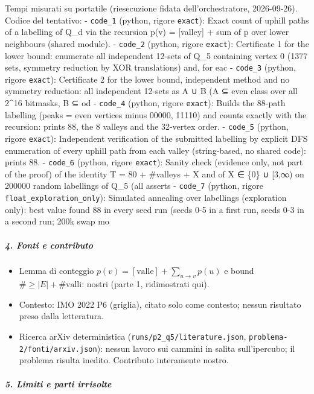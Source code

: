 \documentclass[11pt,a4paper]{article}
\providecommand{\tightlist}{\setlength{\itemsep}{0pt}\setlength{\parskip}{0pt}}
\begin{document}
Tempi misurati su portatile (riesecuzione fidata dell'orchestratore,
2026-09-26). Codice del tentativo: - \texttt{code\_1} (python, rigore
\texttt{exact}): Exact count of uphill paths of a labelling of Q\_d via
the recursion p(v) = {[}valley{]} + sum of p over lower neighbours
(shared module). - \texttt{code\_2} (python, rigore \texttt{exact}):
Certificate 1 for the lower bound: enumerate all independent 12-sets of
Q\_5 containing vertex 0 (1377 sets, symmetry reduction by XOR
translations) and, for eac - \texttt{code\_3} (python, rigore
\texttt{exact}): Certificate 2 for the lower bound, independent method
and no symmetry reduction: all independent 12-sets as A ∪ B (A ⊆ even
class over all 2\^{}16 bitmasks, B ⊆ od - \texttt{code\_4} (python,
rigore \texttt{exact}): Builds the 88-path labelling (peaks = even
vertices minus 00000, 11110) and counts exactly with the recursion:
prints 88, the 8 valleys and the 32-vertex order. - \texttt{code\_5}
(python, rigore \texttt{exact}): Independent verification of the
submitted labelling by explicit DFS enumeration of every uphill path
from each valley (string-based, no shared code): prints 88. -
\texttt{code\_6} (python, rigore \texttt{exact}): Sanity check (evidence
only, not part of the proof) of the identity T = 80 + \#valleys + X and
of X ∈ \{0\} ∪ {[}3,∞) on 200000 random labellings of Q\_5 (all asserts
- \texttt{code\_7} (python, rigore \texttt{float\_exploration\_only}):
Simulated annealing over labellings (exploration only): best value found
88 in every seed run (seeds 0-5 in a first run, seeds 0-3 in a second
run; 200k swap mo

\subparagraph{4. Fonti e contributo}\label{fonti-e-contributo}

\begin{itemize}
\tightlist
\item
  Lemma di conteggio \(p(v)=[\text{valle}]+\sum_{u\to v}p(u)\) e bound
  \(\#\ge|E|+\#\text{valli}\): nostri (parte 1, ridimostrati qui).
\item
  Contesto: IMO 2022 P6 (griglia), citato solo come contesto; nessun
  risultato preso dalla letteratura.
\item
  Ricerca arXiv deterministica (\texttt{runs/p2\_q5/literature.json},
  \texttt{problema-2/fonti/arxiv.json}): nessun lavoro sui cammini in
  salita sull'ipercubo; il problema risulta inedito. Contributo
  interamente nostro.
\end{itemize}

\subparagraph{5. Limiti e parti
irrisolte}\label{limiti-e-parti-irrisolte}
\end{document}
